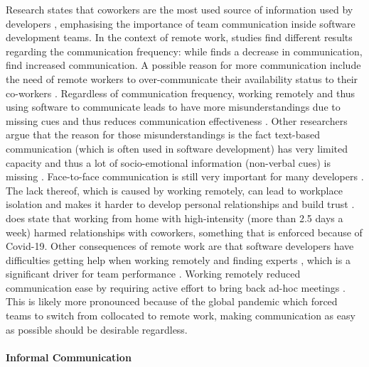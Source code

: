 Research states that coworkers are the most used source of information used by developers \cite{ko2007information}, emphasising the importance of team communication inside software development teams. In the context of remote work, studies find different results regarding the communication frequency: while \cite{kraut1988patterns, allen1984managing} finds a decrease in communication, \cite{mulki2009set} find increased communication. A possible reason for more communication include the need of remote workers to over-communicate their availability status to their co-workers \cite{koehne2012remote}. Regardless of communication frequency, working remotely and thus using software to communicate leads to have more misunderstandings due to missing cues and thus reduces communication effectiveness \cite{mulki2009set}. Other researchers argue that the reason for those misunderstandings is the fact text-based communication (which is often used in software development) has very limited capacity and thus a lot of socio-emotional information (non-verbal cues) is missing \cite{hassib2017heartchat}. Face-to-face communication is still very important for many developers \cite{storey2016social}. The lack thereof, which is caused by working remotely, can lead to workplace isolation and makes it harder to develop personal relationships and build trust \cite{mulki2009set}. \cite{gajendran2007good} does state that working from home with high-intensity (more than 2.5 days a week) harmed relationships with coworkers, something that is enforced because of Covid-19.
Other consequences of remote work are that software developers have difficulties getting help when working remotely and finding experts \cite{herbsleb2003empirical, espinosa2007team}, which is a significant driver for team performance \cite{faraj2000coordinating}. Working remotely reduced communication ease by requiring active effort to bring back ad-hoc meetings \cite{miller2021your}. This is likely more pronounced because of the global pandemic which forced teams to switch from collocated to remote work, making communication as easy as possible should be desirable regardless. 
\\\\
\textbf{Informal Communication}\\
